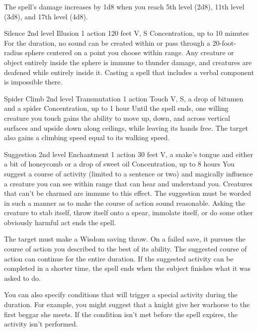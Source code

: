 \documentclass[10pt,a4paper,twoside,bg=print,twocolumn,openany,nodeprecatedcode]{dndbook}
\begin{document}
The spell's damage increases by 1d8 when you reach 5th level (2d8), 11th level (3d8), and 17th level (4d8).



\DndSpellHeader%
{Silence}
{2nd level Illusion}
{1 action}
{120 feet}
{V, S}
{Concentration, up to 10 minutes}
For the duration, no sound can be created within or pass through a 20-foot-radius sphere centered on a point you choose within range. Any creature or object entirely inside the sphere is immune to thunder damage, and creatures are deafened while entirely inside it. Casting a spell that includes a verbal component is impossible there.



\DndSpellHeader%
{Spider Climb}
{2nd level Transmutation}
{1 action}
{Touch}
{V, S, a drop of bitumen and a spider}
{Concentration, up to 1 hour}
Until the spell ends, one willing creature you touch gains the ability to move up, down, and across vertical surfaces and upside down along ceilings, while leaving its hands free. The target also gains a climbing speed equal to its walking speed.



\DndSpellHeader%
{Suggestion}
{2nd level Enchantment}
{1 action}
{30 feet}
{V, a snake's tongue and either a bit of honeycomb or a drop of sweet oil}
{Concentration, up to 8 hours}
You suggest a course of activity (limited to a sentence or two) and magically influence a creature you can see within range that can hear and understand you. Creatures that can't be charmed are immune to this effect. The suggestion must be worded in such a manner as to make the course of action sound reasonable. Asking the creature to stab itself, throw itself onto a spear, immolate itself, or do some other obviously harmful act ends the spell.

The target must make a Wisdom saving throw. On a failed save, it pursues the course of action you described to the best of its ability. The suggested course of action can continue for the entire duration. If the suggested activity can be completed in a shorter time, the spell ends when the subject finishes what it was asked to do.

You can also specify conditions that will trigger a special activity during the duration. For example, you might suggest that a knight give her warhorse to the first beggar she meets. If the condition isn't met before the spell expires, the activity isn't performed.
\end{document}
